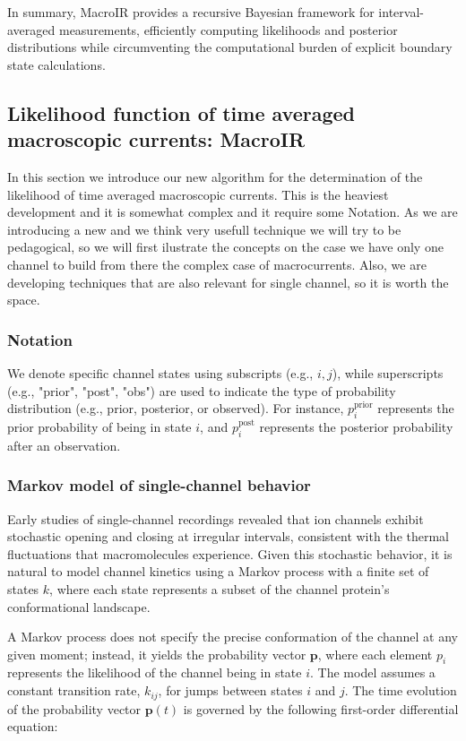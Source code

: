 \documentclass[pdflatex,sn-mathphys-num]{sn-jnl}%
\theoremstyle{thmstyleone}%
\theoremstyle{thmstyletwo}%
\theoremstyle{thmstylethree}%
\begin{document}
In summary, MacroIR provides a recursive Bayesian framework for interval-averaged measurements, efficiently computing likelihoods and posterior distributions while circumventing the computational burden of explicit boundary state calculations.
\subsection{Likelihood function of time averaged macroscopic currents: MacroIR}
In this section we introduce our new algorithm for the determination of the likelihood of time averaged macroscopic currents. This is the heaviest development and it is somewhat complex and it require some Notation.  
As we are introducing a new and we think very usefull technique we will try to be pedagogical, so we will first ilustrate the concepts on the case we have only one channel to build from there the complex case of macrocurrents. Also, we are developing techniques that are also relevant for single channel, so it is worth the space.   

\subsubsection{Notation}
We denote specific channel states using subscripts (e.g., \( i, j \)), while superscripts (e.g., "prior", "post", "obs") are used to indicate the type of probability distribution (e.g., prior, posterior, or observed). For instance, \( p_i^{\text{prior}} \) represents the prior probability of being in state \( i \), and \( p_i^{\text{post}} \) represents the posterior probability after an observation.

\subsubsection{Markov model of single-channel behavior}

Early studies of single-channel recordings revealed that ion channels exhibit stochastic opening and closing at irregular intervals, consistent with the thermal fluctuations that macromolecules experience. Given this stochastic behavior, it is natural to model channel kinetics using a Markov process with a finite set of states \( k \), where each state represents a subset of the channel protein’s conformational landscape. 

A Markov process does not specify the precise conformation of the channel at any given moment; instead, it yields the probability vector \( \boldsymbol{p} \), where each element \( p_i \) represents the likelihood of the channel being in state \( i \). The model assumes a constant transition rate, \( k_{ij} \), for jumps between states \( i \) and \( j \). The time evolution of the probability vector \( \boldsymbol{p}(t) \) is governed by the following first-order differential equation:
\end{document}
